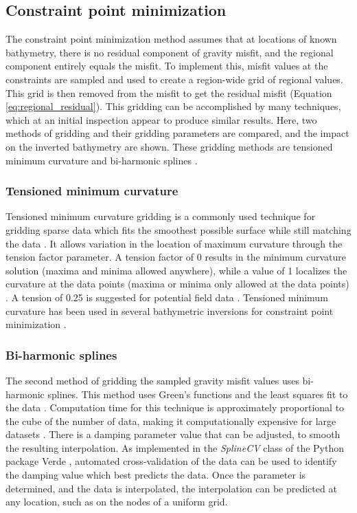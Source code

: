 \subsection{Constraint point minimization} \label{chp3_gridding_comparison}
The constraint point minimization method assumes that at locations of known bathymetry, there is no residual component of gravity misfit, and the regional component entirely equals the misfit. To implement this, misfit values at the constraints are sampled and used to create a region-wide grid of regional values. This grid is then removed from the misfit to get the residual misfit (Equation \ref{eq:regional_residual}). This gridding can be accomplished by many techniques, which at an initial inspection appear to produce similar results. Here, two methods of gridding and their gridding parameters are compared, and the impact on the inverted bathymetry are shown. These gridding methods are tensioned minimum curvature \citep{smithgridding1990} and bi-harmonic splines \citep{sandwellbiharmonic1987}. 

\subsubsection{Tensioned minimum curvature}
Tensioned minimum curvature gridding is a commonly used technique for gridding sparse data which fits the smoothest possible surface while still matching the data \citep{wesselinterpolation1998}. It allows variation in the location of maximum curvature through the tension factor parameter. A tension factor of 0 results in the minimum curvature solution (maxima and minima allowed anywhere), while a value of 1 localizes the curvature at the data points (maxima or minima only allowed at the data points) \citep{smithgridding1990}. A tension of 0.25 is suggested for potential field data \citep{wesselgeneric2019}. Tensioned minimum curvature has been used in several bathymetric inversions for constraint point minimization \citep{yangbathymetry2021, millanconstraining2020, anbathymetry2019}. 

\subsubsection{Bi-harmonic splines}
The second method of gridding the sampled gravity misfit values uses bi-harmonic splines. This method uses Green's functions and the least squares fit to the data \citep{sandwellbiharmonic1987}. Computation time for this technique is approximately proportional to the cube of the number of data, making it computationally expensive for large datasets \citep{dengmoving2011}. There is a damping parameter value that can be adjusted, to smooth the resulting interpolation. As implemented in the \textit{SplineCV} class of the Python package Verde \citep{uiedaverde2018}, automated cross-validation of the data can be used to identify the damping value which  best predicts the data. Once the parameter is determined, and the data is interpolated, the interpolation can be predicted at any location, such as on the nodes of a uniform grid. \\

